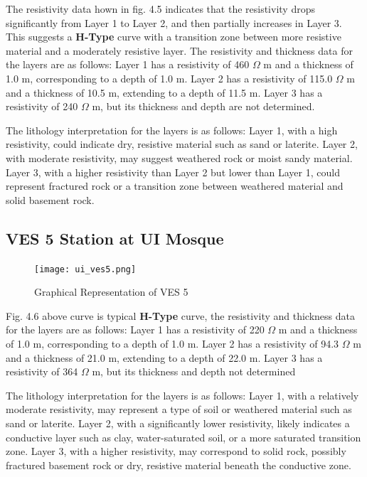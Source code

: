 \documentclass[12pt,a4paper]{report}
\begin{document}
The resistivity data hown in fig. 4.5 indicates that the resistivity drops significantly from Layer 1 to Layer 2, and then partially increases in Layer 3. This suggests a \textbf{H-Type} curve with a transition zone between more resistive material and a moderately resistive layer. The resistivity and thickness data for the layers are as follows: Layer 1 has a resistivity of 460 $\Omega$ m and a thickness of 1.0 m, corresponding to a depth of 1.0 m. Layer 2 has a resistivity of 115.0 $\Omega$ m and a thickness of 10.5 m, extending to a depth of 11.5 m. Layer 3 has a resistivity of 240 $\Omega$ m, but its thickness and depth are not determined.

The lithology interpretation for the layers is as follows: Layer 1, with a high resistivity, could indicate dry, resistive material such as sand or laterite. Layer 2, with moderate resistivity, may suggest weathered rock or moist sandy material. Layer 3, with a higher resistivity than Layer 2 but lower than Layer 1, could represent fractured rock or a transition zone between weathered material and solid basement rock.

\subsection{VES 5 Station at UI Mosque}

\begin{figure}[H]
    \centering
    \texttt{[image: ui\_ves5.png]}
    \caption{Graphical Representation of VES 5}
    \label{fig:VES_5_Curve}
\end{figure}

Fig. 4.6 above curve is typical \textbf{H-Type} curve, the resistivity and thickness data for the layers are as follows: Layer 1 has a resistivity of 220 $\Omega$ m and a thickness of 1.0 m, corresponding to a depth of 1.0 m. Layer 2 has a resistivity of 94.3 $\Omega$ m and a thickness of 21.0 m, extending to a depth of 22.0 m. Layer 3 has a resistivity of 364 $\Omega$ m, but its thickness and depth not determined

The lithology interpretation for the layers is as follows: Layer 1, with a relatively moderate resistivity, may represent a type of soil or weathered material such as sand or laterite. Layer 2, with a significantly lower resistivity, likely indicates a conductive layer such as clay, water-saturated soil, or a more saturated transition zone. Layer 3, with a higher resistivity, may correspond to solid rock, possibly fractured basement rock or dry, resistive material beneath the conductive zone.
\end{document}
